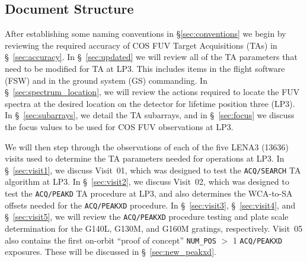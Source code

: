 \subsection{Document Structure}\label{subsec:documentstructure}
	After establishing some naming conventions in \S\ref{sec:conventions} we begin
by reviewing the required accuracy of COS FUV Target Acquisitions (TAs) in \S~\ref{sec:accuracy}.
In \S~\ref{sec:updated} we will review all of the TA parameters that need to be modified
for TA at LP3. This includes items in the flight software (FSW) and in the ground system (GS) commanding.
In \S~\ref{sec:spectrum_location}, we will review the actions required to locate the
FUV spectra at the desired location on the detector for lifetime position three (LP3).
In \S~\ref{sec:subarrays}, we detail the TA subarrays, and in \S~\ref{sec:focus} we discuss the
focus values to be used for COS FUV observations at LP3.

	We will then step through the observations of each of the five LENA3 (13636) visits used to determine
the TA parameters needed for operations at LP3. In \S~\ref{sec:visit1}, we discuss Visit~01, which
was designed to test the \texttt{ACQ/SEARCH} TA algorithm at LP3.
In \S~\ref{sec:visit2}, we discuss Visit~02, which was designed to test the \texttt{ACQ/PEAKD} TA procedure at LP3,
and also determines the WCA-to-SA offsets needed for the \texttt{ACQ/PEAKXD} procedure.
In \S~\ref{sec:visit3}, \S~\ref{sec:visit4}, and \S~\ref{sec:visit5}, we will review the
\texttt{ACQ/PEAKXD} procedure testing and plate scale determination for the G140L, G130M, and G160M
gratings, respectively. Visit~05 also contains the first on-orbit ``proof of concept''
\texttt{NUM\_POS} $>$ 1 \texttt{ACQ/PEAKXD} exposures. These will be discussed in \S~\ref{sec:new_peakxd}.
